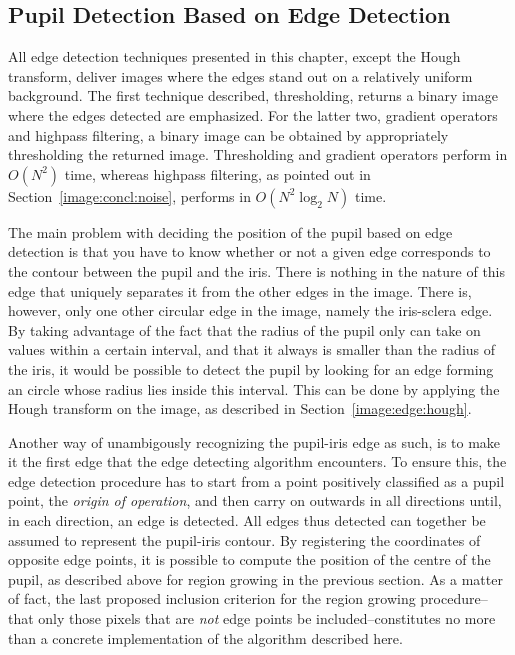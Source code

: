 \subsection{Pupil Detection Based on Edge Detection}
\label{image:concl:edge}

All edge detection techniques presented in this chapter, except the
Hough transform, deliver images where the edges stand out on a
relatively uniform background.  The first technique described,
thresholding, returns a binary image where the edges detected are
emphasized.  For the latter two, gradient operators and highpass
filtering, a binary image can be obtained by appropriately
thresholding the returned image.  Thresholding and gradient operators
perform in $O(N^{2})$ time, whereas highpass filtering, as pointed out
in Section~\ref{image:concl:noise}, performs in $O(N^{2}\log_{2}N)$
time.

The main problem with deciding the position of the pupil based on edge
detection is that you have to know whether or not a given edge
corresponds to the contour between the pupil and the iris.  There is
nothing in the nature of this edge that uniquely separates it from the
other edges in the image.  There is, however, only one other circular
edge in the image, namely the iris-sclera edge.  By taking advantage
of the fact that the radius of the pupil only can take on values
within a certain interval, and that it always is smaller than the
radius of the iris, it would be possible to detect the pupil by
looking for an edge forming an circle whose radius lies inside this
interval.  This can be done by applying the Hough transform on the
image, as described in Section~\ref{image:edge:hough}.

Another way of unambigously recognizing the pupil-iris edge as such,
is to make it the first edge that the edge detecting algorithm
encounters.  To ensure this, the edge detection procedure has to start
from a point positively classified as a pupil point, the {\em origin
  of operation\/}, and then carry on outwards in all directions until,
in each direction, an edge is detected.  All edges thus detected can
together be assumed to represent the pupil-iris contour.  By
registering the coordinates of opposite edge points, it is possible to
compute the position of the centre of the pupil, as described above
for region growing in the previous section.  As a matter of fact, the
last proposed inclusion criterion for the region growing
procedure--that only those pixels that are {\em not\/} edge points be
included--constitutes no more than a concrete implementation of the
algorithm described here.

